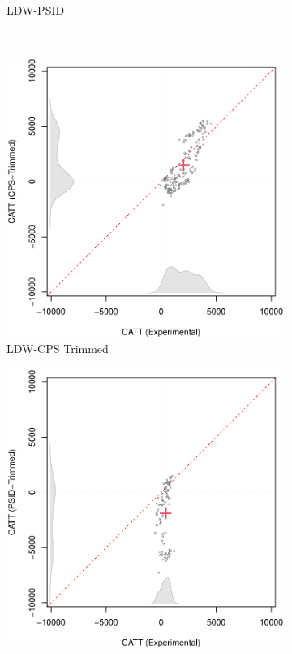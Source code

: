 \documentclass[letterpaper,12pt,leqno]{article}
\begin{document}
\begin{figure}[!ht]
\begin{minipage}[c]{1\textwidth}
\begin{subfigure}{0.45\linewidth}
            \caption{LDW-PSID}
        \end{subfigure}\\
        \begin{subfigure}{0.45\linewidth}
            \includegraphics[width=\linewidth]{catt_cps_trim.pdf}
            \caption{LDW-CPS Trimmed}
        \end{subfigure}
        \begin{subfigure}{0.45\linewidth}
            \includegraphics[width=\linewidth]{catt_PSID_trim.pdf}

\end{subfigure}
\end{minipage}
\end{figure}
\end{document}
